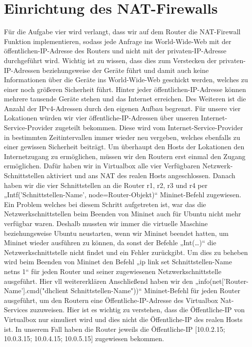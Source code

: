 \documentclass[fontsize=12pt,paper=a4,open=any,parskip=half,
  twoside=false,toc=listof,toc=bibliography,fleqn,leqno,
  captions=nooneline,captions=tableabove,british]{scrbook}
\begin{document}
\section{Einrichtung des NAT-Firewalls}
Für die Aufgabe vier wird verlangt, dass wir auf dem Router die NAT-Firewall Funktion implementieren, sodass jede Anfrage ins World-Wide-Web mit der öffentlichen-IP-Adresse des Routers und nicht mit der privaten-IP-Adresse durchgeführt wird. Wichtig ist zu wissen, dass dies zum Verstecken der privaten-IP-Adressen beziehungsweise der Geräte führt und damit auch keine Informationen über die Geräte ins World-Wide-Web geschickt werden, welches zu einer noch größeren Sicherheit führt. Hinter jeder öffentlichen-IP-Adresse können mehrere tausende Geräte stehen und das Internet erreichen. Des Weiteren ist die Anzahl der IPv4-Adressen durch den eigenen Aufbau begrenzt. Für unsere vier Lokationen würden wir vier öffentliche-IP-Adressen über unseren Internet-Service-Provider zugeteilt bekommen. Diese wird vom Internet-Service-Provider in bestimmten Zeitintervallen immer wieder neu vergeben, welches ebenfalls zu einer gewissen Sicherheit beiträgt.
Um überhaupt den Hosts der Lokationen den Internetzugang zu ermöglichen, müssen wir den Routern erst einmal den Zugang ermöglichen. Dafür haben wir in Virtualbox alle vier Verfügbaren Netzwerk-Schnittstellen aktiviert und ans NAT des realen Hosts angeschlossen. Danach haben wir die vier Schnittstellen an die Router r1, r2, r3 und r4 per „Intf('Schnittstellen-Name', node=Router-Objekt)“ Mininet-Befehl zugewiesen. Ein Problem welches bei diesem Schritt aufgetreten ist, war das die Netzwerkschnittstellen beim Beenden von Mininet auch für Ubuntu nicht mehr verfügbar waren. Deshalb mussten wir immer die virtuelle Maschine beziehungsweise Ubuntu neustarten, wenn wir Mininet beendet hatten, um Mininet wieder ausführen zu können, da sonst der Befehle „Int(…)“ die Netzwerkschnittstelle nicht findet und ein Fehler zurückgibt. Um dies zu beheben wird beim Beenden von Mininet den Befehl „ip link set Schnittstellen-Name netns 1“ für jeden Router und seiner zugewiesenen Netzwerkschnittstelle ausgeführt. Hier vll weitererklären Anschließend haben wir den „info(net['Router-Name'].cmd("dhclient Schnittstellen-Name"))“ Mininet-Befehl für jeden Router ausgeführt, um den Routern eine Öffentliche-IP-Adresse des Virtualbox Nat-Services zuzuweisen. Hier ist es wichtig zu verstehen, dass die Öffentliche-IP von Virtualbox nur simuliert wird und dies nicht die Öffentliche-IP des realen Hosts ist. In unserem Fall haben die Router jeweils die Öffentliche-IP [10.0.2.15; 10.0.3.15; 10.0.4.15; 10.0.5.15] zugewiesen bekommen.
\end{document}
